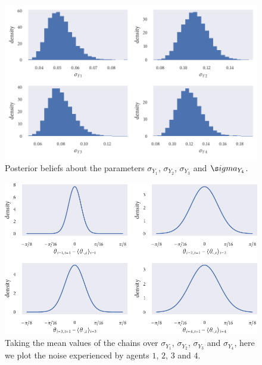 \begin{figure}[!tbp]
	\includegraphics{output/seq05_hist_sigmay.pdf}
	\caption{Posterior beliefs about the parameters $\sigma_{Y_1}$, $\sigma_{Y_2}$, $\sigma_{Y_3}$ and $\s
igma_{Y_4}$.}
	\label{fig:hist_sigmay}
\end{figure}
\begin{figure}[!tbp]
	\includegraphics{output/noise_plot.pdf}
	\caption{Taking the mean values of the chains over $\sigma_{Y_1}$, $\sigma_{Y_2}$, $\sigma_{Y_3}$ and 
$\sigma_{Y_4}$, here we plot the noise experienced by agents $1$, $2$, $3$ and $4$.}
	\label{fig:noise_pdf}
\end{figure}
